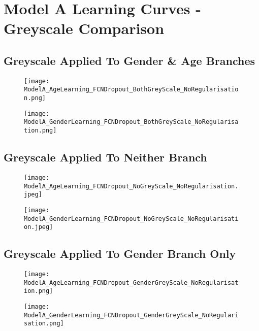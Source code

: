 \section*{Model A Learning Curves - Greyscale Comparison}

\subsection*{Greyscale Applied To Gender \& Age Branches}
\begin{figure}[h!]
    \centering
    \texttt{[image: ModelA\_AgeLearning\_FCNDropout\_BothGreyScale\_NoRegularisation.png]}
    \label{fig:modelA_gs_both_age_lc}
\end{figure}
\begin{figure}[h!]
    \centering
    \texttt{[image: ModelA\_GenderLearning\_FCNDropout\_BothGreyScale\_NoRegularisation.png]}
    \label{fig:modelA_gs_both_gender_lc}
\end{figure}
\newpage

\subsection*{Greyscale Applied To Neither Branch}
\begin{figure}[h!]
    \centering
    \texttt{[image: ModelA\_AgeLearning\_FCNDropout\_NoGreyScale\_NoRegularisation.jpeg]}
    \label{fig:modelA_gs_neither_age_lc}
\end{figure}
\begin{figure}[h!]
    \centering
    \texttt{[image: ModelA\_GenderLearning\_FCNDropout\_NoGreyScale\_NoRegularisation.jpeg]}
    \label{fig:modelA_gs_neither_gender_lc}
\end{figure}
\newpage

\subsection*{Greyscale Applied To Gender Branch Only}
\begin{figure}[h!]
    \centering
    \texttt{[image: ModelA\_AgeLearning\_FCNDropout\_GenderGreyScale\_NoRegularisation.png]}
    \label{fig:modelA_gs_gender_age_lc}
\end{figure}
\begin{figure}[h!]
    \centering
    \texttt{[image: ModelA\_GenderLearning\_FCNDropout\_GenderGreyScale\_NoRegularisation.png]}
    \label{fig:modelA_gs_age_age_lc}
\end{figure}
\newpage

